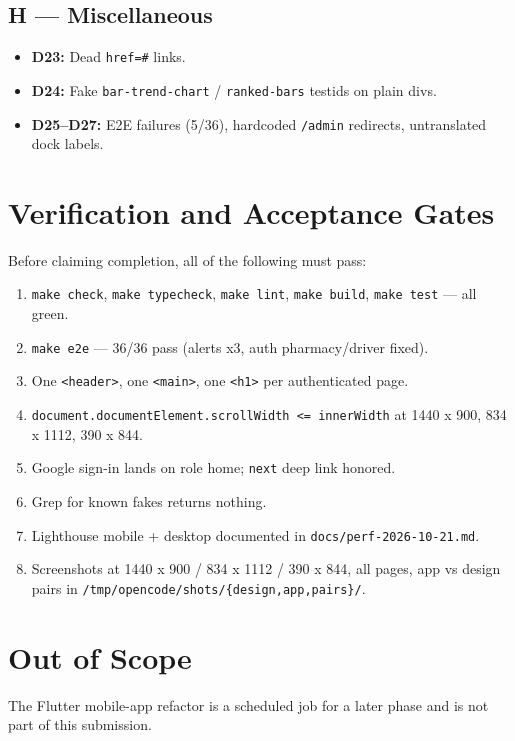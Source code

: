 \documentclass[12pt, a4paper]{article}
\begin{document}
\subsection{H --- Miscellaneous}
\begin{itemize}
    \item \textbf{D23:} Dead \texttt{href=\#} links.
    \item \textbf{D24:} Fake \texttt{bar-trend-chart} / \texttt{ranked-bars} testids on plain divs.
    \item \textbf{D25--D27:} E2E failures (5/36), hardcoded \texttt{/admin} redirects, untranslated dock labels.
\end{itemize}

\section{Verification and Acceptance Gates}

Before claiming completion, all of the following must pass:
\begin{enumerate}
    \item \texttt{make check}, \texttt{make typecheck}, \texttt{make lint}, \texttt{make build}, \texttt{make test} --- all green.
    \item \texttt{make e2e} --- 36/36 pass (alerts x3, auth pharmacy/driver fixed).
    \item One \texttt{<header>}, one \texttt{<main>}, one \texttt{<h1>} per authenticated page.
    \item \texttt{document.documentElement.scrollWidth <= innerWidth} at 1440 x 900, 834 x 1112, 390 x 844.
    \item Google sign-in lands on role home; \texttt{next} deep link honored.
    \item Grep for known fakes returns nothing.
    \item Lighthouse mobile + desktop documented in \texttt{docs/perf-2026-10-21.md}.
    \item Screenshots at 1440 x 900 / 834 x 1112 / 390 x 844, all pages, app vs design pairs in \texttt{/tmp/opencode/shots/\{design,app,pairs\}/}.
\end{enumerate}

\section{Out of Scope}

The Flutter mobile-app refactor is a scheduled job for a later phase and is not part of this submission.
\end{document}
